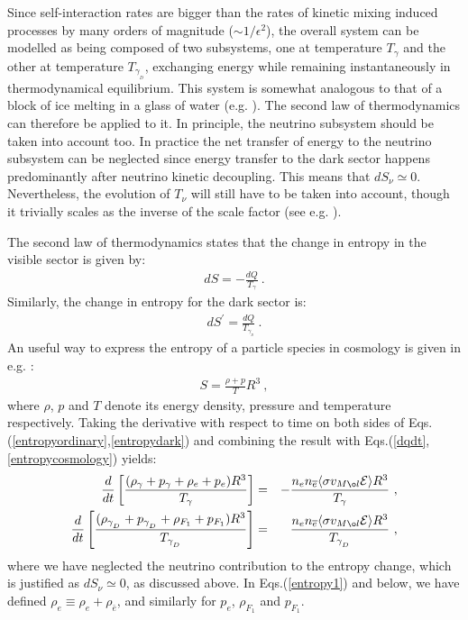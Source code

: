 \documentclass[12pt]{article}
\begin{document}
Since self-interaction rates are bigger than the rates of kinetic mixing induced processes by many orders of magnitude ($\sim 1/\epsilon ^2$), the overall system can be modelled as being composed of two subsystems, one at temperature $T _{\gamma}$ and the other at temperature $T _{\gamma _{_D}}$, exchanging energy while remaining instantaneously in thermodynamical equilibrium. This system is somewhat analogous to that of a block of ice melting in a glass of water (e.g. \cite{feynman}). The second law of thermodynamics can therefore be applied to it. In principle, the neutrino subsystem should be taken into account too. In practice the net transfer of energy to the neutrino subsystem can be neglected since energy transfer to the dark sector happens predominantly after neutrino kinetic decoupling. This means that $dS _{\nu} \simeq 0$. Nevertheless, the evolution of $T _{\nu}$ will still have to be taken into account, though it trivially scales as the inverse of the scale factor (see e.g. \cite{earlyuniverse}).

The second law of thermodynamics states that the change in entropy in the visible sector is given by:
%
\begin{eqnarray}
dS = -\frac{dQ}{T _{\gamma}} \ .
\label{entropyordinary}
\end{eqnarray}
%
Similarly, the change in entropy for the dark sector is:
%
\begin{eqnarray}
dS ^{'} = \frac{dQ}{T _{\gamma _{_D}}} \ .
\label{entropydark}
\end{eqnarray}
%
An useful way to express the entropy of a particle species in cosmology is given in e.g. \cite{earlyuniverse}:
%
\begin{eqnarray}
S = \frac{\rho + p}{T}R^3 \ ,
\label{entropycosmology}
\end{eqnarray}
%
where $\rho$, $p$ and $T$ denote its energy density, pressure and temperature respectively. Taking the derivative with respect to time on both sides of Eqs.(\ref{entropyordinary},\ref{entropydark}) and combining the result with Eqs.(\ref{dqdt},\ref{entropycosmology}) yields:
%
\begin{eqnarray}
\frac{d}{dt} \left [ \frac{(\rho _{\gamma} + p _{\gamma} + \rho _e + p _e)R^3}{T _{\gamma}}\right ] &=& - \frac{n _e n _{\overline{e}} \langle \sigma v_{M\o l} {\cal E} \rangle R^3}{T _{\gamma}} \ , \nonumber \\
\frac{d}{dt} \left [ \frac{(\rho _{\gamma _{_D}} + p _{\gamma _{_D}} + \rho _{F_1} + p _{F_1})R^3}{T _{\gamma _{_D}}}\right ] &=& \frac{n _e n _{\overline{e}} \langle \sigma v_{M\o l} {\cal E} \rangle R^3}{T _{\gamma _{_D}}} \ ,
\label{entropy1}
\end{eqnarray}
%
where we have neglected the neutrino contribution to the entropy change, which is justified as $dS _{\nu} \simeq 0$, as discussed above. In Eqs.(\ref{entropy1}) and below, we have defined $\rho _e \equiv \rho _e + \rho _{\bar{e}}$, and similarly for $p _e$, $\rho _{F_1}$ and $p _{F_1}$.
\end{document}
